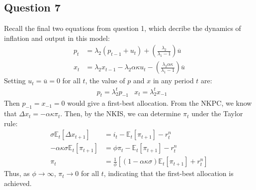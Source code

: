 \documentclass{article}
\newcommand{\Et}[1]{\mathbb{E}_t\left[#1\right]}
\begin{document}

\subsection*{Question 7}
Recall the final two equations from question 1, which decribe the dynamics of inflation and output in this model:
\begin{align*}
	p_t &= \lambda_2(p_{t-1} + u_t) + \left(\frac{\lambda_2}{\lambda_1-1}\right)\overline{u}									\\
	x_t &= \lambda_2x_{t-1} - \lambda_2\alpha\kappa u_t - \left(\frac{\lambda_2\alpha\kappa}{\lambda_1-1}\right)\overline{u}
\end{align*}
Setting ${u_t=\overline{u}=0}$ for all $t$, the value of $p$ and $x$ in any period $t$ are:
\begin{align*}
	&p_t = \lambda_2^tp_{-1}	&x_t = \lambda_2^tx_{-1}
\end{align*}
Then ${p_{-1}=x_{-1}=0}$ would give a first-best allocation. From the NKPC, we know that ${\Delta x_t=-\alpha\kappa\pi_t}$. Then, by the NKIS, we can determine $\pi_t$ under the Taylor rule:
\begin{align*}
	\sigma\Et{\Delta x_{t+1}} &= i_t - \Et{\pi_{t+1}} - r^n_t						\\
	-\alpha\kappa\sigma\Et{\pi_{t+1}} &= \phi\pi_t - \Et{\pi_{t+1}} - r^n_t			\\
	\pi_t &= \frac{1}{\phi}\left[(1-\alpha\kappa\sigma)\Et{\pi_{t+1}}+r^n_t\right]
\end{align*}
Thus, as $\phi\rightarrow\infty$, $\pi_t\rightarrow 0$ for all $t$, indicating that the first-best allocation is achieved.


\end{document}
